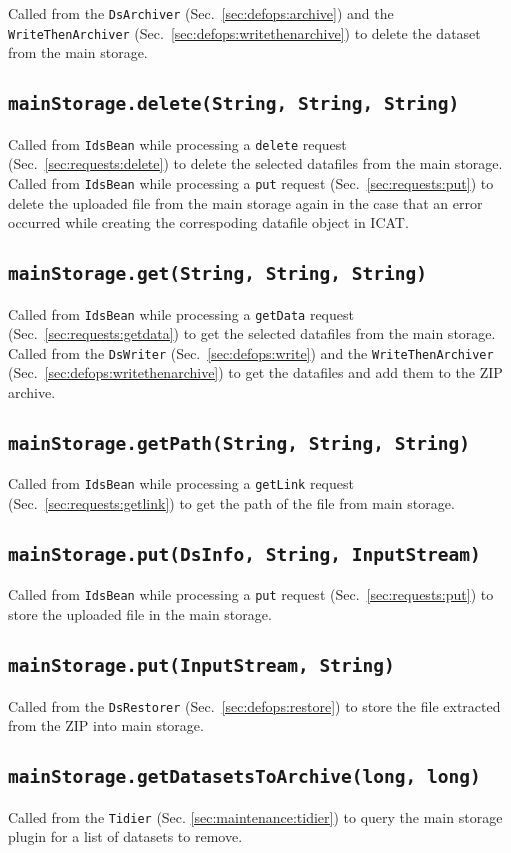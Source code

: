 \documentclass[paper=a4]{scrartcl}
\begin{document}
Called from the \texttt{DsArchiver} (Sec.\ \ref{sec:defops:archive})
and the \texttt{WriteThenArchiver}
(Sec.\ \ref{sec:defops:writethenarchive}) to delete the dataset from
the main storage.

\subsection{\texttt{mainStorage.delete(String, String, String)}}

Called from \texttt{IdsBean} while processing a \texttt{delete}
request (Sec.\ \ref{sec:requests:delete}) to delete the selected
datafiles from the main storage.  Called from \texttt{IdsBean} while
processing a \texttt{put} request (Sec.\ \ref{sec:requests:put}) to
delete the uploaded file from the main storage again in the case that
an error occurred while creating the correspoding datafile object in
ICAT.

\subsection{\texttt{mainStorage.get(String, String, String)}}

Called from \texttt{IdsBean} while processing a \texttt{getData}
request (Sec.\ \ref{sec:requests:getdata}) to get the selected
datafiles from the main storage.  Called from the \texttt{DsWriter}
(Sec.\ \ref{sec:defops:write}) and the \texttt{Write\-Then\-Archiver}
(Sec.\ \ref{sec:defops:writethenarchive}) to get the datafiles and add
them to the ZIP archive.

\subsection{\texttt{mainStorage.getPath(String, String, String)}}

Called from \texttt{IdsBean} while processing a \texttt{getLink}
request (Sec.\ \ref{sec:requests:getlink}) to get the path of the file
from main storage.

\subsection{\texttt{mainStorage.put(DsInfo, String, InputStream)}}

Called from \texttt{IdsBean} while processing a \texttt{put} request
(Sec.\ \ref{sec:requests:put}) to store the uploaded file in the main
storage.

\subsection{\texttt{mainStorage.put(InputStream, String)}}

Called from the \texttt{DsRestorer} (Sec.\ \ref{sec:defops:restore})
to store the file extracted from the ZIP into main storage.

\subsection{\texttt{mainStorage.getDatasetsToArchive(long, long)}}

Called from the \texttt{Tidier} (Sec. \ref{sec:maintenance:tidier}) to
query the main storage plugin for a list of datasets to remove.
\end{document}
